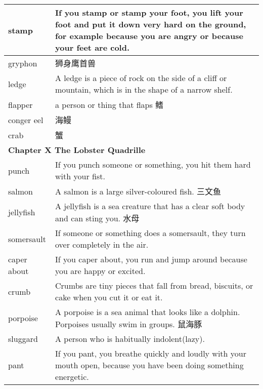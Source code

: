 \documentclass{article}
\begin{document}
\begin{center}
\begin{longtable}{|l|p{9cm}|}
\hline
stamp
&
If you stamp or stamp your foot, you lift your foot and put it down very hard on the ground, for example because you are angry or because your feet are cold.
\\

\hline
gryphon
&
狮身鹰首兽
\\

\hline
ledge
&
A ledge is a piece of rock on the side of a cliff or mountain, which is in the shape of a narrow shelf.
\\

\hline
flapper
&
a person or thing that flaps 鳍
\\

\hline
conger eel
&
海鳗
\\

\hline
crab
&
蟹
\\

\hline
\multicolumn{2}{|l|}{\textbf{Chapter X The Lobster Quadrille}}\\

\hline
punch
&
If you punch someone or something, you hit them hard with your fist.
\\

\hline
salmon
&
A salmon is a large silver-coloured fish. 三文鱼
\\

\hline
jellyfish
&
A jellyfish is a sea creature that has a clear soft body and can sting you. 水母
\\

\hline
somersault
&
If someone or something does a somersault, they turn over completely in the air.
\\

\hline
caper about
&
If you caper about, you run and jump around because you are happy or excited.
\\

\hline
crumb
&
Crumbs are tiny pieces that fall from bread, biscuits, or cake when you cut it or eat it.
\\

\hline
porpoise
&
A porpoise is a sea animal that looks like a dolphin. Porpoises usually swim in groups. 鼠海豚
\\

\hline
sluggard
&
A person who is habitually indolent(lazy).
\\

\hline
pant
&
If you pant, you breathe quickly and loudly with your mouth open, because you have been doing something energetic.
\\

\hline

\end{longtable}
\end{center}
\end{document}
